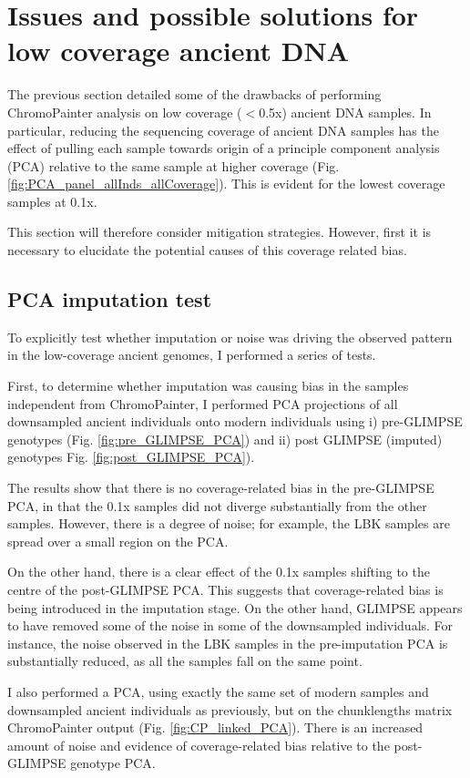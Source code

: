 \section{Issues and possible solutions for low coverage ancient DNA}

The previous section detailed some of the drawbacks of performing ChromoPainter analysis on low coverage ($<$0.5x) ancient DNA samples. In particular, reducing the sequencing coverage of ancient DNA samples has the effect of pulling each sample towards origin of a principle component analysis (PCA) relative to the same sample at higher coverage (Fig. \ref{fig:PCA_panel_allInds_allCoverage}). This is evident for the lowest coverage samples at 0.1x. 

This section will therefore consider mitigation strategies. However, first it is necessary to elucidate the potential causes of this coverage related bias. 

\subsection{PCA imputation test}

To explicitly test whether imputation or noise was driving the observed pattern in the low-coverage ancient genomes, I performed a series of tests. 

First, to determine whether imputation was causing bias in the samples independent from ChromoPainter, I performed PCA projections of all downsampled ancient individuals onto modern individuals using i) pre-GLIMPSE genotypes (Fig. \ref{fig:pre_GLIMPSE_PCA}) and ii) post GLIMPSE (imputed) genotypes Fig. \ref{fig:post_GLIMPSE_PCA}). 

The results show that there is no coverage-related bias in the pre-GLIMPSE PCA, in that the 0.1x samples did not diverge substantially from the other samples. However, there is a degree of noise; for example, the LBK samples are spread over a small region on the PCA. 

On the other hand, there is a clear effect of the 0.1x samples shifting to the centre of the post-GLIMPSE PCA. This suggests that coverage-related bias is being introduced in the imputation stage. On the other hand, GLIMPSE appears to have removed some of the noise in some of the downsampled individuals. For instance, the noise observed in the LBK samples in the pre-imputation PCA is substantially reduced, as all the samples fall on the same point. 

I also performed a PCA, using exactly the same set of modern samples and downsampled ancient individuals as previously, but on the chunklengths matrix ChromoPainter output (Fig. \ref{fig:CP_linked_PCA}). There is an increased amount of noise  and evidence of coverage-related bias relative to the post-GLIMPSE genotype PCA.

